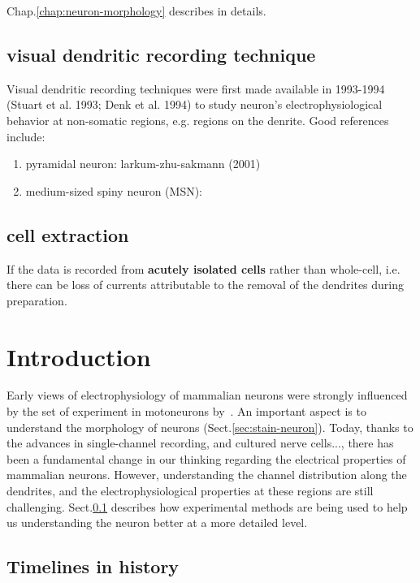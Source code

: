 Chap.\ref{chap:neuron-morphology} describes in details.

\subsection{visual dendritic recording technique}
\label{sec:visual-dendritic-recording}

Visual dendritic recording techniques were first made available in 1993-1994
(Stuart et al. 1993; Denk et al. 1994) to study neuron's electrophysiological
behavior at non-somatic regions, e.g. regions on the denrite. 
Good references include:
\begin{enumerate}
  \item pyramidal neuron: larkum-zhu-sakmann (2001)
  
  \item medium-sized spiny neuron (MSN): 
\end{enumerate}

\subsection{cell extraction}

If the data is recorded from {\bf acutely isolated cells} rather than
whole-cell, i.e. there can be loss of currents attributable to the removal of
the dendrites during preparation.




\section{Introduction}

Early views of electrophysiology of mammalian neurons were strongly influenced
by the set of experiment in motoneurons by~\citep{coombs1956tcmr}. An important
aspect is to understand the morphology of neurons (Sect.\ref{sec:stain-neuron}).
Today, thanks to the advances in single-channel recording, and cultured nerve
cells..., there has been a fundamental change in our thinking regarding the
electrical properties of mammalian neurons. However, understanding the channel
distribution along the dendrites, and the electrophysiological properties at
these regions are still challenging. Sect.\ref{sec:visual-dendritic-recording}
describes how experimental methods are being used to help us understanding the
neuron better at a more detailed level.

\subsection{Timelines in history}
\label{sec:timelines}


